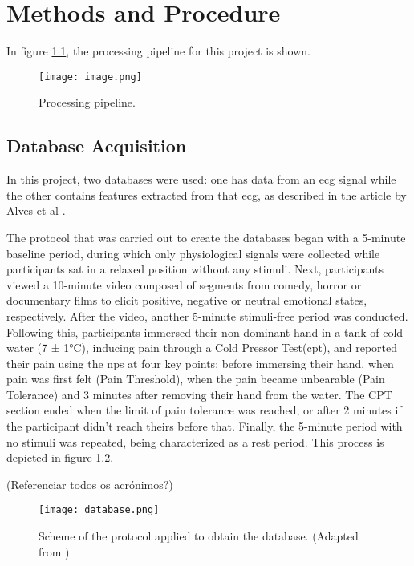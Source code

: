 \chapter{Methods and Procedure}
\label{chapter:methods}

In figure \ref{fig:image}, the processing pipeline for this project is shown.

\begin{figure}[h!]
    \centering
    \texttt{[image: image.png]}
    \caption{Processing pipeline.}
    \label{fig:image}
\end{figure}

\section{Database Acquisition}
In this project, two databases were used: one has data from an \ac{ecg} signal while the other contains features extracted from that \ac{ecg}, as described in the article by Alves et al \cite{Alves2024}.

The protocol that was carried out to create the databases began with a 5-minute baseline period, during which only physiological signals were collected while participants sat in a relaxed position without any stimuli. 
Next, participants viewed a 10-minute video composed of segments from comedy, horror or documentary films to elicit positive, negative or neutral emotional states, respectively. 
After the video, another 5-minute stimuli-free period was conducted. 
Following this, participants immersed their non-dominant hand in a tank of cold water (7 ± 1°C), inducing pain through a Cold Pressor Test(\ac{cpt}), and reported their pain using the \ac{nps} at four key points: before immersing their hand, when pain was first felt (Pain Threshold), when the pain became unbearable (Pain Tolerance) and 3 minutes after removing their hand from the water. 
The CPT section ended when the limit of pain tolerance was reached, or after 2 minutes if the participant didn’t reach theirs before that. 
Finally, the 5-minute period with no stimuli was repeated, being characterized as a rest period. 
This process is depicted in figure \ref{fig:database}. 

(Referenciar todos os acrónimos?)

\begin{figure}[h!]
    \centering
    \texttt{[image: database.png]}
    \caption{Scheme of the protocol applied to obtain the database. (Adapted from \cite{Alves2024})}
    \label{fig:database}
\end{figure}

